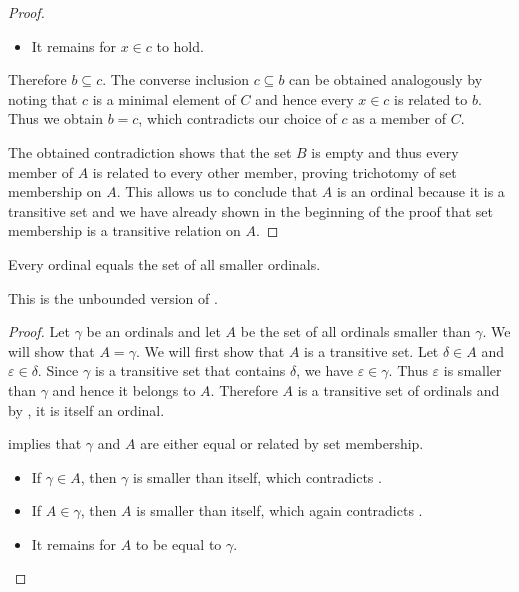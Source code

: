 \begin{proof}
\begin{itemize}
    \item It remains for \( x \in c \) to hold.
  \end{itemize}

  Therefore \( b \subseteq c \). The converse inclusion \( c \subseteq b \) can be obtained analogously by noting that \( c \) is a minimal element of \( C \) and hence every \( x \in c \) is related to \( b \). Thus we obtain \( b = c \), which contradicts our choice of \( c \) as a member of \( C \).

  The obtained contradiction shows that the set \( B \) is empty and thus every member of \( A \) is related to every other member, proving trichotomy of set membership on \( A \). This allows us to conclude that \( A \) is an ordinal because it is a transitive set and we have already shown in the beginning of the proof that set membership is a transitive relation on \( A \).
\end{proof}

\begin{proposition}\label{thm:ordinal_is_set_of_smaller_ordinals}
  Every ordinal equals the set of all smaller ordinals.

  This is the unbounded version of .
\end{proposition}
\begin{proof}
  Let \( \gamma \) be an ordinals and let \( A \) be the set of all ordinals smaller than \( \gamma \). We will show that \( A = \gamma \). We will first show that \( A \) is a transitive set. Let \( \delta \in A \) and \( \varepsilon \in \delta \). Since \( \gamma \) is a transitive set that contains \( \delta \), we have \( \varepsilon \in \gamma \). Thus \( \varepsilon \) is smaller than \( \gamma \) and hence it belongs to \( A \). Therefore \( A \) is a transitive set of ordinals and by , it is itself an ordinal.

   implies that \( \gamma \) and \( A \) are either equal or related by set membership.
  \begin{itemize}
    \item If \( \gamma \in A \), then \( \gamma \) is smaller than itself, which contradicts .

    \item If \( A \in \gamma \), then \( A \) is smaller than itself, which again contradicts .

    \item It remains for \( A \) to be equal to \( \gamma \).
  \end{itemize}
\end{proof}


